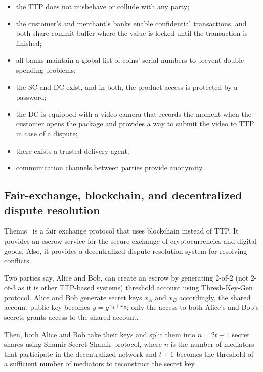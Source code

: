 \documentclass{ieeeaccess}
\begin{document}
\begin{itemize}
    \item the TTP does not misbehave or collude with any party;
    \item the customer's and merchant's banks enable confidential transactions, and both share commit-buffer where the value is locked until the transaction is finished;
    \item all banks maintain a global list of coins' serial numbers to prevent double-spending problems;
    \item the SC and DC exist, and in both, the product access is protected by a password;
    \item the DC is equipped with a video camera that records the moment when the customer opens the package and provides a way to submit the video to TTP in case of a dispute;
    \item there exists a trusted delivery agent;
    \item communication channels between parties provide anonymity.
\end{itemize}

\subsection{Fair-exchange, blockchain, and decentralized dispute resolution}
\label{themis-towards-decentralized-escrow-of-cryptocurrencies-without-trusted-third-parties}

Themis~\cite{meng2019themis} is a fair exchange protocol that uses blockchain instead of TTP. It provides an escrow service for the secure exchange of cryptocurrencies and digital goods. Also, it provides a decentralized dispute resolution system for resolving conflicts.

Two parties say, Alice and Bob, can create an escrow by generating
2-of-2 (not 2-of-3 as it is other TTP-based systems) threshold account
using Thresh-Key-Gen protocol. Alice and Bob generate secret keys
\(x_A\) and \(x_B\) accordingly, the shared account public key becomes
\(y = g^{x_A+x_B}\); only the access to both Alice's and Bob's secrets
grants access to the shared account.

Then, both Alice and Bob take their keys and split them into
\(n=2t+1\) secret shares using Shamir Secret Shamir protocol, where
\(n\) is the number of mediators that participate in the decentralized
network and \(t+1\) becomes the threshold of a sufficient number of mediators to reconstruct the secret key.
\end{document}

